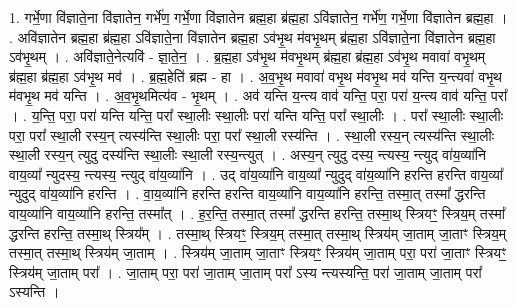 \documentclass[17pt]{extarticle}
\begin{document}
1. गर्भे॒णा वि॑ज्ञाते॒ना वि॑ज्ञातेन॒ गर्भे॑ण॒ गर्भे॒णा वि॑ज्ञातेन ब्रह्म॒हा ब्र॑ह्म॒हा ऽवि॑ज्ञातेन॒ गर्भे॑ण॒ गर्भे॒णा वि॑ज्ञातेन ब्रह्म॒हा । . अवि॑ज्ञातेन ब्रह्म॒हा ब्र॑ह्म॒हा ऽवि॑ज्ञाते॒ना वि॑ज्ञातेन ब्रह्म॒हा ऽव॑भृ॒थ म॑वभृ॒थम् ब्र॑ह्म॒हा ऽवि॑ज्ञाते॒ना वि॑ज्ञातेन ब्रह्म॒हा ऽव॑भृ॒थम् । . अवि॑ज्ञाते॒नेत्यवि॑ - ज्ञा॒ते॒न॒ । . ब्र॒ह्म॒हा ऽव॑भृ॒थ म॑वभृ॒थम् ब्र॑ह्म॒हा ब्र॑ह्म॒हा ऽव॑भृ॒थ मवावा॑ वभृ॒थम् ब्र॑ह्म॒हा ब्र॑ह्म॒हा ऽव॑भृ॒थ मव॑ । . ब्र॒ह्म॒हेति॑ ब्रह्म - हा । . अ॒व॒भृ॒थ मवावा॑ वभृ॒थ म॑वभृ॒थ मव॑ यन्ति य॒न्त्यवा॑ वभृ॒थ म॑वभृ॒थ मव॑ यन्ति । . अ॒व॒भृ॒थमित्य॑व - भृ॒थम् । . अव॑ यन्ति य॒न्त्य वाव॑ यन्ति॒ परा॒ परा॑ य॒न्त्य वाव॑ यन्ति॒ परा᳚ । . य॒न्ति॒ परा॒ परा॑ यन्ति यन्ति॒ परा᳚ स्था॒लीः स्था॒लीः परा॑ यन्ति यन्ति॒ परा᳚ स्था॒लीः । . परा᳚ स्था॒लीः स्था॒लीः परा॒ परा᳚ स्था॒ली रस्य॒न् त्यस्य॑न्ति स्था॒लीः परा॒ परा᳚ स्था॒ली रस्य॑न्ति । . स्था॒ली रस्य॒न् त्यस्य॑न्ति स्था॒लीः स्था॒ली रस्य॒न् त्युदु दस्य॑न्ति स्था॒लीः स्था॒ली रस्य॒न्त्युत् । . अस्य॒न् त्युदु दस्य॒ न्त्यस्य॒ न्त्युद् वा॑य॒व्या॑नि वाय॒व्या᳚ न्युदस्य॒ न्त्यस्य॒ न्त्युद् वा॑य॒व्या॑नि । . उद् वा॑य॒व्या॑नि वाय॒व्या᳚ न्युदुद् वा॑य॒व्या॑नि हरन्ति हरन्ति वाय॒व्या᳚ न्युदुद् वा॑य॒व्या॑नि हरन्ति । . वा॒य॒व्या॑नि हरन्ति हरन्ति वाय॒व्या॑नि वाय॒व्या॑नि हरन्ति॒ तस्मा॒त् तस्मा᳚ द्धरन्ति वाय॒व्या॑नि वाय॒व्या॑नि हरन्ति॒ तस्मा᳚त् । . ह॒र॒न्ति॒ तस्मा॒त् तस्मा᳚ द्धरन्ति हरन्ति॒ तस्मा॒थ् स्त्रियꣳ॒॒ स्त्रिय॒म् तस्मा᳚ द्धरन्ति हरन्ति॒ तस्मा॒थ् स्त्रिय᳚म् । . तस्मा॒थ् स्त्रियꣳ॒॒ स्त्रिय॒म् तस्मा॒त् तस्मा॒थ् स्त्रिय॑म् जा॒ताम् जा॒ताꣳ स्त्रिय॒म् तस्मा॒त् तस्मा॒थ् स्त्रिय॑म् जा॒ताम् । . स्त्रिय॑म् जा॒ताम् जा॒ताꣳ स्त्रियꣳ॒॒ स्त्रिय॑म् जा॒ताम् परा॒ परा॑ जा॒ताꣳ स्त्रियꣳ॒॒ स्त्रिय॑म् जा॒ताम् परा᳚ । . जा॒ताम् परा॒ परा॑ जा॒ताम् जा॒ताम् परा᳚ ऽस्य न्त्यस्यन्ति॒ परा॑ जा॒ताम् जा॒ताम् परा᳚ ऽस्यन्ति । \newline
\end{document}
